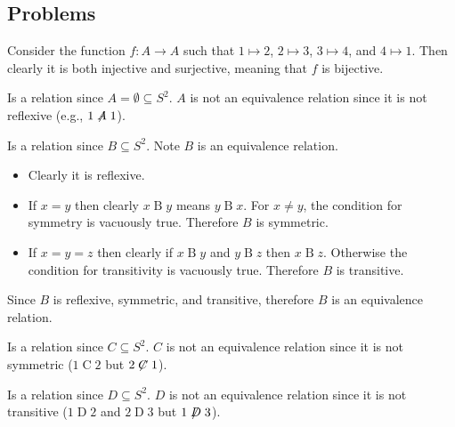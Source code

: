 \subsection*{Problems}
\begin{questions}
    \item Consider the function $f: A \to A$ such that $1 \mapsto 2$, $2 \mapsto 3$, $3 \mapsto 4$, and $4 \mapsto 1$. Then clearly it is both injective and surjective, meaning that $f$ is bijective.

    \item \begin{partquestions}{\alph*}
        \item Is a relation since $A = \emptyset \subseteq S^2$. $A$ is not an equivalence relation since it is not reflexive (e.g., $1\not\mathrel{A}1$).

        \item Is a relation since $B \subseteq S^2$. Note $B$ is an equivalence relation.
        \begin{itemize}
            \item Clearly it is reflexive.
            \item If $x = y$ then clearly $x\mathrel{B}y$ means $y\mathrel{B}x$. For $x \neq y$, the condition for symmetry is vacuously true. Therefore $B$ is symmetric.
            \item If $x = y = z$ then clearly if $x\mathrel{B}y$ and $y\mathrel{B}z$ then $x\mathrel{B}z$. Otherwise the condition for transitivity is vacuously true. Therefore $B$ is transitive.
        \end{itemize}
        Since $B$ is reflexive, symmetric, and transitive, therefore $B$ is an equivalence relation.

        \item Is a relation since $C \subseteq S^2$. $C$ is not an equivalence relation since it is not symmetric ($1\mathrel{C}2$ but $2\not\mathrel{C}1$).

        \item Is a relation since $D \subseteq S^2$. $D$ is not an equivalence relation since it is not transitive ($1\mathrel{D}2$ and $2\mathrel{D}3$ but $1\not\mathrel{D}3$).
    \end{partquestions}


\end{questions}
